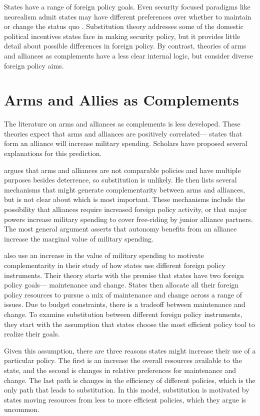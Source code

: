 \documentclass[12pt]{article}
\begin{document}
States have a range of foreign policy goals. Even security focused paradigms like neorealism admit states may have different preferences over whether to maintain or change the status quo \citep{Schweller1994, Walt2009}. Substitution theory addresses some of the domestic political incentives states face in making security policy, but it provides little detail about possible differences in foreign policy. By contrast, theories of arms and alliances as complements have a less clear internal logic, but consider diverse foreign policy aims. 


\section*{Arms and Allies as Complements}

The literature on arms and alliances as complements is less developed. These theories expect that arms and alliances are positively correlated--- states that form an alliance will increase military spending. Scholars have proposed several explanations for this prediction.

\citet{Diehl1994} argues that arms and alliances are not comparable policies and have multiple purposes besides deterrence, so substitution is unlikely. He then lists several mechanisms that might generate complementarity between arms and alliances, but is not clear about which is most important. These mechanisms include the possibility that alliances require increased foreign policy activity, or that major powers increase military spending to cover free-riding by junior alliance partners. The most general argument asserts that autonomy benefits from an alliance increase the marginal value of military spending.

\citet{MorganPalmer2006} also use an increase in the value of military spending to motivate complementarity in their study of how states use different foreign policy instruments. Their theory starts with the premise that states have two foreign policy goals--- maintenance and change. States then allocate all their foreign policy resources to pursue a mix of maintenance and change across a range of issues. Due to budget constraints, there is a tradeoff between maintenance and change. To examine substitution between different foreign policy instruments, they start with the assumption that states choose the most efficient policy tool to realize their goals. 

Given this assumption, there are three reasons states might increase their use of a particular policy. The first is an increase the overall resources available to the state, and the second is changes in relative preferences for maintenance and change. The last path is changes in the efficiency of different policies, which is the only path that leads to substitution. In this model, substitution is motivated by states moving resources from less to more efficient policies, which they argue is uncommon. 
\end{document}
